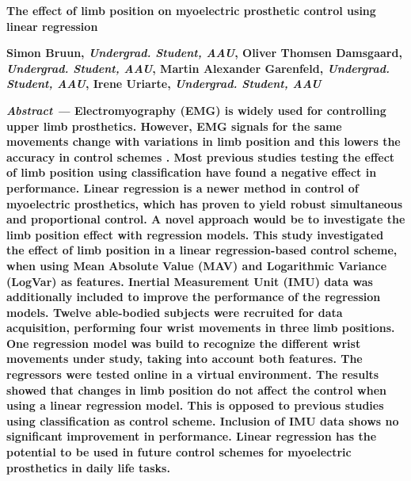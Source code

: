 %
		
\begin{center}	
	{\huge\textbf{The effect of limb position on myoelectric prosthetic control using linear regression}}
	
	
	{\large \textbf{Simon Bruun, \textit{Undergrad. Student, AAU}, Oliver Thomsen Damsgaard, \textit{Undergrad. Student, AAU}, Martin Alexander Garenfeld, \textit{Undergrad. Student, AAU}, Irene Uriarte, \textit{Undergrad. Student, AAU}}}
\end{center}
	
	\begin{multicols}{2}


%		
\textbf{\textit{Abstract ---} Electromyography (EMG) is widely used for controlling upper limb prosthetics. However, EMG signals for the same movements change with variations in limb position and this lowers the accuracy in control schemes \cite{Fougner2012}. Most previous studies testing the effect of limb position using classification have found a negative effect in performance. Linear regression is a newer method in control of myoelectric prosthetics, which has proven to yield robust simultaneous and proportional control. A novel approach would be to investigate the limb position effect with regression models. This study investigated the effect of limb position in a linear regression-based control scheme, when using Mean Absolute Value (MAV) and Logarithmic Variance (LogVar) as features. Inertial Measurement Unit (IMU) data was additionally included to improve the performance of the regression models. Twelve able-bodied subjects were recruited for data acquisition, performing four wrist movements in three limb positions. One regression model was build to recognize the different wrist movements under study, taking into account both features. The regressors were tested online in a virtual environment. The results showed that changes in limb position do not affect the control when using a linear regression model. This is opposed to previous studies using classification as control scheme. Inclusion of IMU data shows no significant improvement in performance. Linear regression has the potential to be used in future control schemes for myoelectric prosthetics in daily life tasks.}


\end{multicols}

